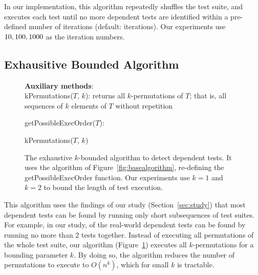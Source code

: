 In our implementation, this algorithm repeatedly
shuffles the test suite, and executes each test until
no more dependent tests are identified within a
pre-defined number of iterations (default: \smalltrialnum iterations).
Our experiments use $10,
100, 1000$ as the iteration numbers.



\subsection{Exhausitive Bounded Algorithm}
\label{sec:basic}

\begin{figure}[t]
\textbf{Auxiliary methods}:\\
kPermutations($T$, $k$): returns all $k$-permutations of $T$; that is, all
sequences of $k$ elements of $T$ without repetition

\medskip

getPossibleExecOrder($T$):\\
\vspace{-5mm}
\begin{algorithmic}[1]
\RETURN kPermutations($T$, $k$)
\end{algorithmic}

\vspace{-3mm}
\caption {The exhaustive $k$-bounded algorithm to detect dependent tests.
It uses the algorithm of Figure~\ref{fig:basealgorithm}, re-defining the
getPossibleExecOrder function.
Our experiments use $k=1$ and $k=2$ to bound the length of
test execution. } 
\label{fig:exhaustivealgorithm}
\end{figure}



This algorithm uses the findings of our study
(Section~\ref{sec:study})
that most dependent tests can be found by running only short
subsequences of test suites. For example,
in our study, \pertange of the real-world dependent tests
can be found by running no more than 2 tests together.
Instead of executing all permutations of the
whole test suite, our algorithm (Figure~\ref{fig:exhaustivealgorithm})
executes all $k$-permutations for a bounding
parameter $k$.
By doing so, the algorithm reduces
the number of permutations to execute
to $O(n^k)$, which for small $k$ is tractable. 


